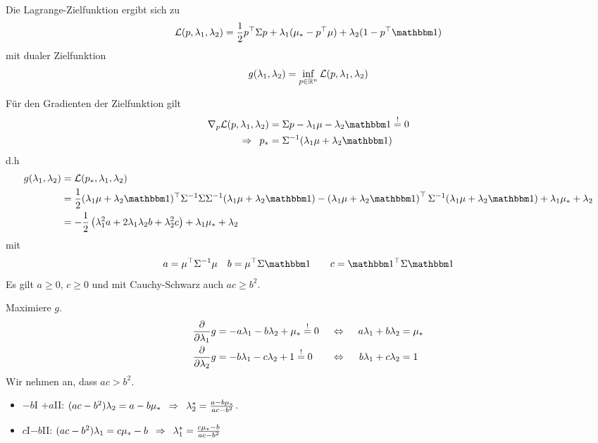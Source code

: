 Die Lagrange-Zielfunktion ergibt sich zu 
\begin{equation*}
	\mathcal{L}(p,\lambda_1,\lambda_2) = \frac{1}{2} \trans{p} \Sigma p + \lambda_1 (\mu_\ast - \trans{p} \mu) + \lambda_2 (1-\trans{p} \one)
\end{equation*}
mit dualer Zielfunktion
\begin{equation*}
	g(\lambda_1, \lambda_2) = \inf_{p \in \mathbb{R}^n} \mathcal{L}(p, \lambda_1, \lambda_2)
\end{equation*}

Für den Gradienten der Zielfunktion gilt
\begin{equation*}
	\begin{aligned}
		\nabla_p \mathcal{L}(p, \lambda_1, \lambda_2) &= \Sigma p - \lambda_1 \mu - \lambda_2 \one \overset{!}{=} 0 \\
		\follows p_\ast &= \Sigma^{-1} (\lambda_1 \mu + \lambda_2 \one)
	\end{aligned}
\end{equation*}
d.h 
\begin{align*}
	g(\lambda_1, \lambda_2) 
	&= \mathcal{L}(p_\ast, \lambda_1, \lambda_2) \\
	&= \frac{1}{2} \trans{(\lambda_1 \mu + \lambda_2 \one)} \Sigma^{-1} \Sigma \Sigma^{-1} (\lambda_1 \mu + \lambda_2 \one) - \transpose{\lambda_1 \mu + \lambda_2 \one} \Sigma^{-1} (\lambda_1 \mu + \lambda_2 \one) + \lambda_1 \mu_\ast + \lambda_2 \\
	&= -\frac{1}{2} \brackets{\lambda_1^2 a + 2 \lambda_1 \lambda_2 b + \lambda_2^2 c} + \lambda_1 \mu_\ast + \lambda_2
\end{align*}
mit
\begin{equation*}
	a = \trans{\mu} \Sigma^{-1} \mu \quad b = \trans{\mu} \Sigma \one \qquad c = \trans{\one} \Sigma \one
\end{equation*}
Es gilt $a \ge 0$, $c \ge 0$ und mit Cauchy-Schwarz auch $ac \ge b^2$.

Maximiere $g$.
\begin{align*}
	\frac{\partial}{\partial \lambda_1 } g &= -a \lambda_1 - b \lambda_2 + \mu_\ast \overset{!}{=} 0 &\enskip \Leftrightarrow \enskip&& a \lambda_1 + b \lambda_2 &= \mu_\ast \\
	\frac{\partial}{\partial \lambda_2 } g &= -b \lambda_1 -c \lambda_2 + 1 \overset{!}{=} 0 &\enskip \Leftrightarrow \enskip&& b \lambda_1 + c \lambda_2 &= 1
\end{align*}
Wir nehmen an, dass $ac > b^2$.
\begin{itemize}
	\item $-b$I $+a$II: $(ac - b^2) \lambda_2 = a - b \mu_\ast \enskip \Rightarrow \enskip \lambda_2^\ast = \frac{a - b \mu_\ast}{ac - b^2}$. 
	\item $c$I$-b$II: $(ac - b^2) \lambda_1 = c\mu_\ast - b \enskip \Rightarrow \enskip \lambda_1^\ast = \frac{c \mu_\ast - b}{ac - b^2}$
\end{itemize}

